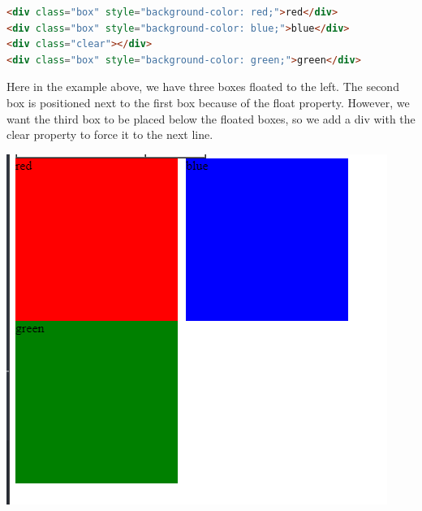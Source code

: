 \documentclass[11pt]{article}
\begin{document}
\begin{enumerate}
\begin{lstlisting}[language=html, caption=Internal Style]
<div class="box" style="background-color: red;">red</div>
<div class="box" style="background-color: blue;">blue</div>
<div class="clear"></div>
<div class="box" style="background-color: green;">green</div>
\end{lstlisting} 
Here in the example above, we have three boxes floated to the left. The second box is positioned next to the first box because of the float property. However, we want the third box to be placed below the floated boxes, so we add a div with the clear property to force it to the next line.

\includegraphics{./resources/clear_float.PNG}

\end{enumerate}
\end{document}
